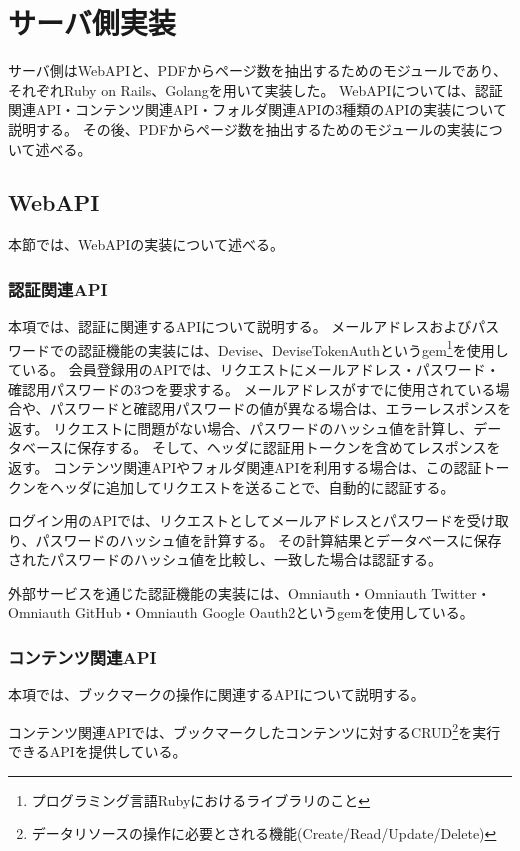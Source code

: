 \section{サーバ側実装}
サーバ側はWebAPIと、PDFからページ数を抽出するためのモジュールであり、それぞれRuby on Rails、Golangを用いて実装した。
WebAPIについては、認証関連API・コンテンツ関連API・フォルダ関連APIの3種類のAPIの実装について説明する。
その後、PDFからページ数を抽出するためのモジュールの実装について述べる。

\subsection{WebAPI}
本節では、WebAPIの実装について述べる。

\subsubsection{認証関連API}
本項では、認証に関連するAPIについて説明する。
メールアドレスおよびパスワードでの認証機能の実装には、Devise\cite{devise}、DeviseTokenAuth\cite{devise-token-auth}というgem\footnote{プログラミング言語Rubyにおけるライブラリのこと}を使用している。
会員登録用のAPIでは、リクエストにメールアドレス・パスワード・確認用パスワードの3つを要求する。
メールアドレスがすでに使用されている場合や、パスワードと確認用パスワードの値が異なる場合は、エラーレスポンスを返す。
リクエストに問題がない場合、パスワードのハッシュ値を計算し、データベースに保存する。
そして、ヘッダに認証用トークンを含めてレスポンスを返す。
コンテンツ関連APIやフォルダ関連APIを利用する場合は、この認証トークンをヘッダに追加してリクエストを送ることで、自動的に認証する。

ログイン用のAPIでは、リクエストとしてメールアドレスとパスワードを受け取り、パスワードのハッシュ値を計算する。
その計算結果とデータベースに保存されたパスワードのハッシュ値を比較し、一致した場合は認証する。

外部サービスを通じた認証機能の実装には、Omniauth\cite{omniauth}・Omniauth Twitter\cite{omniauth-twitter}・Omniauth GitHub\cite{omniauth-github}・Omniauth Google Oauth2\cite{omniauth-google-oauth2}というgemを使用している。

\subsubsection{コンテンツ関連API}
本項では、ブックマークの操作に関連するAPIについて説明する。

コンテンツ関連APIでは、ブックマークしたコンテンツに対するCRUD\footnote{データリソースの操作に必要とされる機能(Create/Read/Update/Delete)}を実行できるAPIを提供している。

